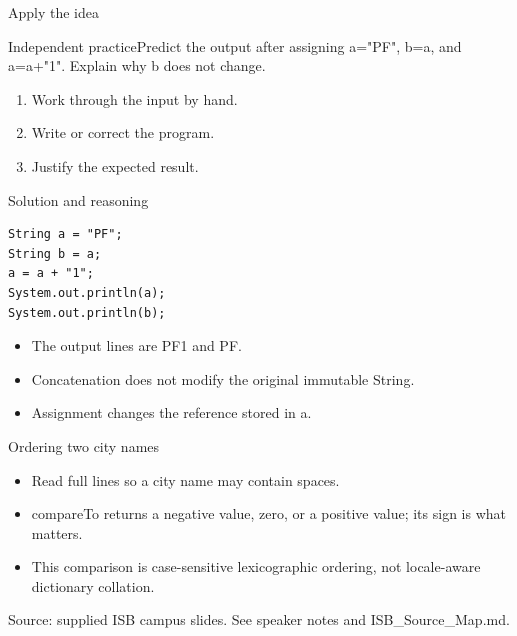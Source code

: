 \documentclass[10pt,aspectratio=169]{beamer}
\begin{document}
\begin{frame}[fragile,t]{Apply the idea}
\begin{alertblock}{Independent practice}Predict the output after assigning a="PF", b=a, and a=a+"1". Explain why b does not change.\end{alertblock}\vspace{3mm}\begin{enumerate}\item Work through the input by hand.\item Write or correct the program.\item Justify the expected result.\end{enumerate}
\end{frame}

\begin{frame}[fragile,t]{Solution and reasoning}
\begin{lstlisting}
String a = "PF";
String b = a;
a = a + "1";
System.out.println(a);
System.out.println(b);
\end{lstlisting}\vspace{1mm}\small\begin{itemize}
\item The output lines are PF1 and PF.
\item Concatenation does not modify the original immutable String.
\item Assignment changes the reference stored in a.
\end{itemize}
\end{frame}

\begin{frame}[fragile,t]{Ordering two city names}
\begin{itemize}
\item Read full lines so a city name may contain spaces.
\item compareTo returns a negative value, zero, or a positive value; its sign is what matters.
\item This comparison is case{-}sensitive lexicographic ordering, not locale{-}aware dictionary collation.
\end{itemize}
\vspace{3mm}\footnotesize\textcolor{accent}{Source: supplied ISB campus slides. See speaker notes and ISB\_Source\_Map.md.}
\end{frame}
\end{document}
